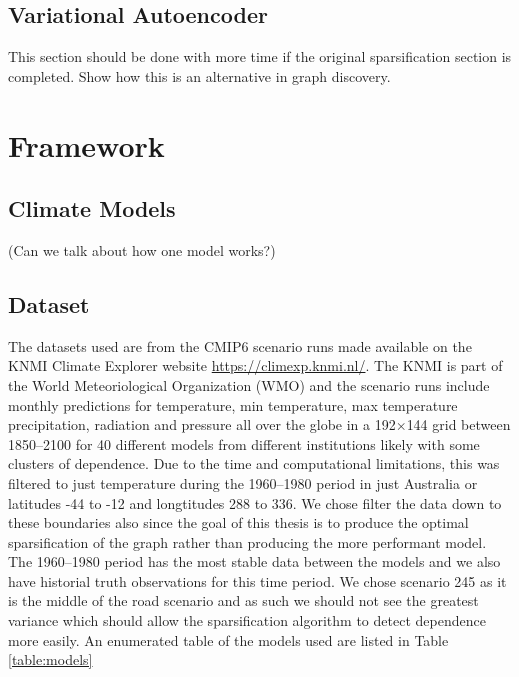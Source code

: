\documentclass[honours,12pt]{unswthesis}
\numberwithin{equation}{section}
\begin{document}
\section{Variational Autoencoder}\label{vgae}
This section should be done with more time if the original sparsification section is completed.
Show how this is an alternative in graph discovery.




\chapter{Framework}\label{framework}



\section{Climate Models}\label{climate}
(Can we talk about how one model works?)

\section{Dataset}\label{data}
The datasets used are from the CMIP6 scenario runs made available on the KNMI Climate Explorer website \url{https://climexp.knmi.nl/}. 
The KNMI is part of the World Meteoriological Organization (WMO) and the scenario runs include monthly predictions for temperature, min temperature, max temperature
precipitation, radiation and pressure all over the globe in a 192$\times$144 grid between 1850--2100 for 40 different models from different institutions likely with some clusters of dependence. 
Due to the time and computational limitations, 
this was filtered to just temperature during the 1960--1980 period in just Australia or latitudes -44{\textdegree} to -12{\textdegree} and longtitudes 288{\textdegree} to 336{\textdegree}. 
We chose filter the data down to these boundaries also since the goal of this thesis is to produce the optimal sparsification of the graph rather than producing the more performant model.
The 1960--1980 period has the most stable data between the models and we also have historial truth observations for this time period.
We chose scenario 245 as it is the middle of the road scenario and as such we should not see the greatest variance which
should allow the sparsification algorithm to detect dependence more easily. An enumerated table of the models used are listed in Table \ref{table:models}
\end{document}
